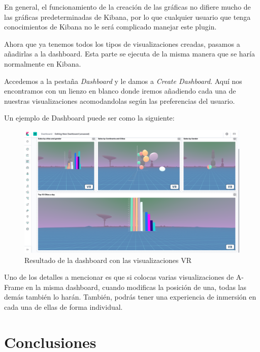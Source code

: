\documentclass[a4paper, 12pt]{book}
\begin{document}
En general, el funcionamiento de la creación de las gráficas no difiere mucho de las gráficas predeterminadas de Kibana, por lo que cualquier usuario que tenga conocimientos de Kibana no le será complicado manejar este plugin.

Ahora que ya tenemos todos los tipos de visualizaciones creadas, pasamos a añadirlas a la dashboard. Esta parte se ejecuta de la misma manera que se haría normalmente en Kibana.

Accedemos a la pestaña \textit{Dashboard} y le damos a \textit{Create Dashboard}. Aquí nos encontramos con un lienzo en blanco donde iremos añadiendo cada una de nuestras visualizaciones acomodandolas según las preferencias del usuario.

Un ejemplo de Dashboard puede ser como la siguiente:


\begin{figure}[H]
  \centering
  \includegraphics[width=12cm, keepaspectratio]{img/development/dashboard-use.png}
  \caption{Resultado de la dashboard con las visualizaciones VR}
  \label{fig:dashboardresultado}
\end{figure}

Uno de los detalles a mencionar es que si colocas varias visualizaciones de A-Frame en la misma dashboard, cuando modificas la posición de una, todas las demás también lo harán. También, podrás tener una experiencia de inmersión en cada una de ellas de forma individual.



\cleardoublepage
\chapter{Conclusiones}
\label{sec:conclusiones} 
\end{document}
